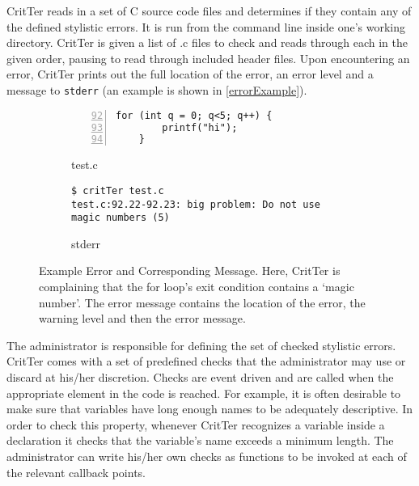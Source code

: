 \documentclass[12pt]{report}
\newcommand{\programName}{CritTer\xspace}
\begin{document}
\programName reads in a set of C source code files and determines if they contain any of the 
defined stylistic errors. It is run from the command line inside one's working directory. \programName is 
given a list of .c files to check and reads through each in the given order, pausing to read through 
included header files. Upon encountering an error, \programName prints out the full location of the error, 
an error level and a message to \lstinline{stderr} (an example is shown in \autoref{errorExample}). 

\begin{figure}
\begin{subfigure}[b]{.49\linewidth}
\caption{test.c}
\label{errorExampleCode}
\begin{lstlisting}[numbers=left, firstnumber=92, xleftmargin=.8cm]
	for (int q = 0; q<5; q++) {
		printf("hi");
	}
\end{lstlisting}
\end{subfigure}
\begin{subfigure}[b]{.49\linewidth}
\caption{stderr}
\label{errorExampleStderr}
\begin{lstlisting}[xleftmargin=.7cm]
$ critTer test.c
test.c:92.22-92.23: big problem: Do not use magic numbers (5)
\end{lstlisting}
\end{subfigure}
\caption[Example Error and Corresponding Message]{Example Error and Corresponding Message. Here, \programName is complaining that the for loop's exit condition contains a `magic number'. The error message contains the location of the error, the warning level and then the error message.}
\label{errorExample}
\end{figure}

The administrator is responsible for defining the set of checked stylistic errors. \programName 
comes with a set of predefined checks that the administrator may use or discard at his\slash her 
discretion. Checks are event driven and are called when the appropriate element in the code is reached. 
For example, it is often desirable to make sure that variables have long enough names to be adequately 
descriptive. In order to check this property, whenever \programName recognizes a variable inside a 
declaration it checks that the variable's name exceeds a minimum length. The administrator can write 
his\slash her own checks as functions to be invoked at each of the relevant callback points.
\end{document}
